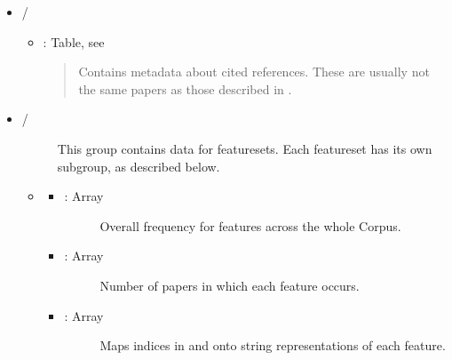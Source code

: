 \documentclass[letterpaper,10pt,english]{sphinxmanual}
\begin{document}
\begin{fulllineitems}
\begin{itemize}
\begin{itemize}
\begin{itemize}
\begin{description}
\end{description}

\end{itemize}

\item {} 
/
\begin{itemize}
\item {} 
: Table, see {\hyperref[tethne.persistence.hdf5.util:tethne.persistence.hdf5.util.papers_table]{}}
\begin{quote}

Contains metadata about cited references. These are usually not the same
papers as those described in .
\end{quote}

\end{itemize}

\item {} \begin{description}
\item[{/}] \leavevmode
This group contains data for featuresets. Each featureset has its own
subgroup, as described below.

\end{description}
\begin{itemize}
\item {} 
\begin{itemize}
\item {} \begin{description}
\item[{: Array}] \leavevmode
Overall frequency for features across the whole Corpus.

\end{description}

\item {} \begin{description}
\item[{: Array}] \leavevmode
Number of papers in which each feature occurs.

\end{description}

\item {} \begin{description}
\item[{: Array}] \leavevmode
Maps indices in  and  onto string
representations of each feature.

\end{description}


\end{itemize}
\end{itemize}
\end{itemize}
\end{itemize}
\end{fulllineitems}
\end{document}
